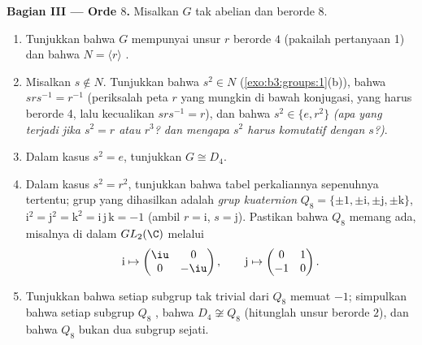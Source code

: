 \begin{problem}
\medskip
\noindent\textbf{Bagian III --- Orde $8$.} Misalkan $G$ tak abelian dan
berorde $8$.
\begin{enumerate}[resume]
  \item Tunjukkan bahwa $G$ mempunyai unsur $r$ berorde $4$ (pakailah
        pertanyaan 1) dan bahwa $N = \langle r\rangle$ .
  \item Misalkan $s \notin N$. Tunjukkan bahwa $s^2 \in N$
        (\cref{exo:b3:groups:1}(b)), bahwa $srs^{-1} = r^{-1}$
        (periksalah peta $r$ yang mungkin di bawah konjugasi,
        yang harus berorde 4, lalu kecualikan $srs^{-1} = r$), dan
        bahwa $s^2 \in \{e, r^2\}$ \emph{(apa yang terjadi jika $s^2 = r$
        atau $r^3$? dan mengapa $s^2$ harus komutatif dengan $s$?)}.
  \item Dalam kasus $s^2 = e$, tunjukkan $G \cong D_4$.
  \item Dalam kasus $s^2 = r^2$, tunjukkan bahwa tabel
        perkaliannya sepenuhnya tertentu; grup yang dihasilkan adalah
        \emph{grup kuaternion} $Q_8 =
        \{\pm 1, \pm \mathrm i, \pm \mathrm j, \pm \mathrm k\}$,
        $\mathrm i^2 = \mathrm j^2 = \mathrm k^2 = \mathrm i\,
        \mathrm j\,\mathrm k = -1$ (ambil $r = \mathrm i$, $s =
        \mathrm j$). Pastikan bahwa $Q_8$ memang ada, misalnya di dalam
        $GL_2(\C)$ melalui
        \[
        \mathrm i \mapsto \begin{pmatrix} \iu & 0\\ 0 & -\iu
        \end{pmatrix},
        \qquad
        \mathrm j \mapsto \begin{pmatrix} 0 & 1\\ -1 & 0
        \end{pmatrix}.
        \]
  \item Tunjukkan bahwa setiap subgrup tak trivial dari $Q_8$ memuat
        $-1$; simpulkan bahwa setiap subgrup $Q_8$ , bahwa
        $D_4 \not\cong Q_8$ (hitunglah unsur berorde $2$), dan
        bahwa $Q_8$ bukan  dua subgrup
        sejati.
\end{enumerate}


\end{problem}
